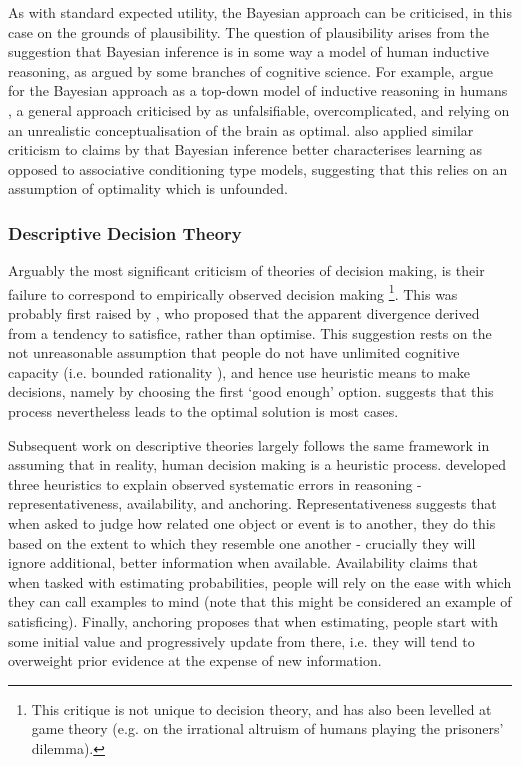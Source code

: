 As with standard expected utility, the Bayesian approach can be criticised,
in this case on the grounds of plausibility. The question of plausibility
arises from the suggestion that Bayesian inference is in some way
a model of human inductive reasoning, as argued by some branches of
cognitive science. For example, \citeauthor{Tenenbaum2006} argue
for the Bayesian approach as a top-down model of inductive reasoning
in humans \citep{Tenenbaum2006,Griffiths2010}, a general approach
criticised by \citet{Bowers2012} as unfalsifiable, overcomplicated,
and relying on an unrealistic conceptualisation of the brain as optimal.
\citet{Miller2012} also applied similar criticism to claims by \citet{Gallistel2012}
that Bayesian inference better characterises learning as opposed to
associative conditioning type models, suggesting that this relies
on an assumption of optimality which is unfounded.


\subsubsection{Descriptive Decision Theory}

Arguably the most significant criticism of theories of decision making,
is their failure to correspond to empirically observed decision making
\footnote{This critique is not unique to decision theory, and has also been
levelled at game theory (e.g. \citet{Fehr2003} on the irrational
altruism of humans playing the prisoners' dilemma).%
}. This was probably first raised by \citet{Simon1956}, who proposed that the
apparent divergence derived from a tendency to satisfice, rather than
optimise. This suggestion rests on the not unreasonable assumption
that people do not have unlimited cognitive capacity (i.e. bounded
rationality \citep{Simon2000}), and hence use heuristic means to
make decisions, namely by choosing the first `good enough' option.
\citeauthor{Simon1956} suggests that this process nevertheless leads
to the optimal solution is most cases.

Subsequent work on descriptive theories largely follows the same framework
in assuming that in reality, human decision making is a heuristic
process. \citet{Tversky1974} developed three heuristics to explain
observed systematic errors in reasoning - representativeness, availability,
and anchoring. Representativeness suggests that when asked to judge
how related one object or event is to another, they do this based
on the extent to which they resemble one another - crucially they
will ignore additional, better information when available. Availability
claims that when tasked with estimating probabilities, people will
rely on the ease with which they can call examples to mind (note that
this might be considered an example of satisficing). Finally, anchoring
proposes that when estimating, people start with some initial value
and progressively update from there, i.e. they will tend to overweight
prior evidence at the expense of new information. 

